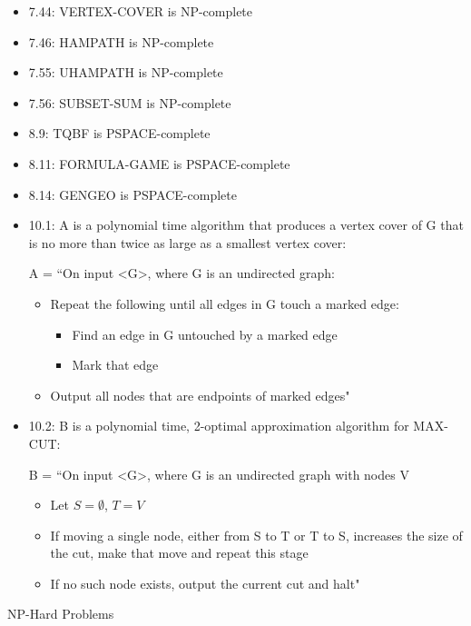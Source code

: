 \documentclass[2pt,legalpaper]{scrartcl}
\makeatletter
\renewcommand{\section}{\@startsection{section}{1}{0mm}
  {-1ex plus -.5ex minus -.2ex}
  {0.5ex plus .2ex}
{\normalfont\large\bfseries}}
\makeatother
\begin{document}
\begin{multicols}{6}
\begin{itemize}
        \item 7.44: VERTEX-COVER is NP-complete
        \item 7.46: HAMPATH is NP-complete
        \item 7.55: UHAMPATH is NP-complete
        \item 7.56: SUBSET-SUM is NP-complete
        \item 8.9: TQBF is PSPACE-complete
        \item 8.11: FORMULA-GAME is PSPACE-complete
        \item 8.14: GENGEO is PSPACE-complete
        \item 10.1: A is a polynomial time algorithm that produces a vertex cover of G that is no more than twice as large as a smallest vertex cover:
        
            A = ``On input <G>, where G is an undirected graph:
            \begin{itemize}
                \item Repeat the following until all edges in G touch a marked edge:
                \begin{itemize}
                    \item Find an edge in G untouched by a marked edge
                    \item Mark that edge
                \end{itemize}
                 \item Output all nodes that are endpoints of marked edges"
            \end{itemize}

        \item 10.2: B is a polynomial time, 2-optimal approximation algorithm for MAX-CUT:
            
            B = ``On input <G>, where G is an undirected graph with nodes V
            \begin{itemize}
                \item Let $S = \emptyset$, $T = V$
                \item If moving a single node, either from S to T or T to S, increases the size of the cut, make that move and repeat this stage
                \item If no such node exists, output the current cut and halt"
            \end{itemize}
  \end{itemize}


  \section{NP-Hard Problems}


\end{multicols}
\end{document}
